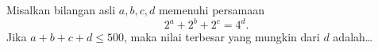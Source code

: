 Misalkan bilangan asli $a, b, c, d$ memenuhi persamaan $$2^a+2^b+2^c=4^d.$$
Jika $a+b+c+d \le 500$, maka nilai terbesar yang mungkin dari $d$ adalah\dots



